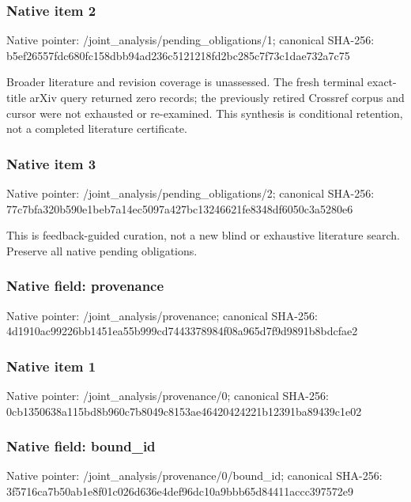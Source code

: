 \documentclass[10pt,a4paper]{article}
\begin{document}
\subsubsection{Native item 2}
Native pointer: /joint\_\allowbreak{}analysis/pending\_\allowbreak{}obligations/1; canonical SHA-256: b5ef26557fdc680fc158dbb94ad236c5121218fd2bc285c7f73c1dae732a7c75

\begingroup\raggedright\sloppy Broader literature and revision coverage is unassessed. The fresh terminal exact-title arXiv query returned zero records;\allowbreak{} the previously retired Crossref corpus and cursor were not exhausted or re-examined. This synthesis is conditional retention,\allowbreak{} not a completed literature certificate.\par\endgroup

\subsubsection{Native item 3}
Native pointer: /joint\_\allowbreak{}analysis/pending\_\allowbreak{}obligations/2; canonical SHA-256: 77c7bfa320b590e1beb7a14ec5097a427bc13246621fe8348df6050c3a5280e6

\begingroup\raggedright\sloppy This is feedback-guided curation,\allowbreak{} not a new blind or exhaustive literature search. Preserve all native pending obligations.\par\endgroup

\subsubsection{Native field: provenance}
Native pointer: /joint\_\allowbreak{}analysis/provenance; canonical SHA-256: 4d1910ac99226bb1451ea55b999cd7443378984f08a965d7f9d9891b8bdcfae2

\subsubsection{Native item 1}
Native pointer: /joint\_\allowbreak{}analysis/provenance/0; canonical SHA-256: 0cb1350638a115bd8b960c7b8049c8153ae46420424221b12391ba89439c1e02

\subsubsection{Native field: bound\_\allowbreak{}id}
Native pointer: /joint\_\allowbreak{}analysis/provenance/0/bound\_\allowbreak{}id; canonical SHA-256: 3f5716ca7b50ab1e8f01c026d636e4def96dc10a9bbb65d84411accc397572e9
\end{document}
